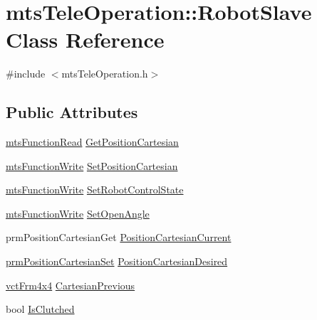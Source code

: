 \hypertarget{classmts_tele_operation_1_1_robot_slave}{}\section{mts\+Tele\+Operation\+:\+:Robot\+Slave Class Reference}
\label{classmts_tele_operation_1_1_robot_slave}


{\ttfamily \#include $<$mts\+Tele\+Operation.\+h$>$}

\subsection*{Public Attributes}
\begin{DoxyCompactItemize}
\item 
\hyperlink{classmts_function_read}{mts\+Function\+Read} \hyperlink{classmts_tele_operation_1_1_robot_slave_a4e162dfa31d136f8f7f44fed8a069e6b}{Get\+Position\+Cartesian}
\item 
\hyperlink{classmts_function_write}{mts\+Function\+Write} \hyperlink{classmts_tele_operation_1_1_robot_slave_a1459465173fd01f73a99062b2fbba3f0}{Set\+Position\+Cartesian}
\item 
\hyperlink{classmts_function_write}{mts\+Function\+Write} \hyperlink{classmts_tele_operation_1_1_robot_slave_a7d66a6da265a36a7f88492030adb29af}{Set\+Robot\+Control\+State}
\item 
\hyperlink{classmts_function_write}{mts\+Function\+Write} \hyperlink{classmts_tele_operation_1_1_robot_slave_afeff3929a101951648742bcf9c7b9c1d}{Set\+Open\+Angle}
\item 
prm\+Position\+Cartesian\+Get \hyperlink{classmts_tele_operation_1_1_robot_slave_a73c0eae30312661f3992f9d1b3a31c5a}{Position\+Cartesian\+Current}
\item 
\hyperlink{classprm_position_cartesian_set}{prm\+Position\+Cartesian\+Set} \hyperlink{classmts_tele_operation_1_1_robot_slave_ab79377bd91a457f5e32b86be683d2155}{Position\+Cartesian\+Desired}
\item 
\hyperlink{vct_transformation_types_8h_a33da47f4deb2556b37a69a2c44b29d75}{vct\+Frm4x4} \hyperlink{classmts_tele_operation_1_1_robot_slave_a677cbc91dd8a2e32697c3345f0ef91fb}{Cartesian\+Previous}
\item 
bool \hyperlink{classmts_tele_operation_1_1_robot_slave_ad99b773634528c1eeafb37e730c6f76f}{Is\+Clutched}
\end{DoxyCompactItemize}


